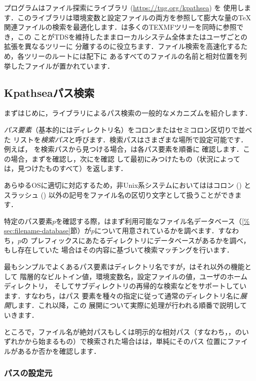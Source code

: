 \documentclass[uplatex,dvipdfmx,tombow]{jsarticle}
\begin{document}
\Webc プログラムはファイル探索に\KPS ライブラリ (\url{https://tug.org/kpathsea}) を
使用します．このライブラリは環境変数と設定ファイルの両方を参照して膨大な量の\TeX
関連ファイルの検索を最適化します．\Webc は多くのTEXMFツリーを同時に参照でき，この
ことがTDSを維持したままローカルシステム全体またはユーザごとの拡張を異なるツリーに
分離するのに役立ちます．ファイル検索を高速化するため，各ツリーのルートには配下に
あるすべてのファイルの名前と相対位置を列挙したファイルが置かれています．

\subsection{Kpathseaパス検索}
\label{sec:kpathsea}

まずはじめに，\KPS ライブラリによるパス検索の一般的なメカニズムを紹介します．

\emph{パス要素}（基本的にはディレクトリ名）をコロンまたはセミコロン区切りで並べた
リストを\emph{検索パス}と呼びます．検索パスはさまざまな場所で設定可能です．例えば，
を検索パスから見つける場合，\KPS は各パス要素を順番に
確認します．この場合，まずを確認し，次にを確認
して最初にみつけたもの（状況によっては，見つけたものすべて）を返します．

あらゆるOSに適切に対応するため，非Unix系システムにおいては\KPS はコロン (\samp{:}) と
スラッシュ (\samp{/}) 以外の記号をファイル名の区切り文字として扱うことができます．

特定のパス要素$p$を確認する際，\KPS はまず利用可能なファイル名データベース（\ref{%
sec:filename-database}節）が$p$について用意されているかを調べます．すなわち，$p$の
プレフィックスにあたるディレクトリにデータベースがあるかを調べ，もし存在していた
場合はその内容に基づいて検索マッチングを行います．

最もシンプルでよくあるパス要素はディレクトリ名ですが，\KPS はそれ以外の機能として
階層的なビルトイン値，環境変数名，設定ファイルの値，ユーザのホームディレクトリ，
そしてサブディレクトリの再帰的な検索などをサポートしています．すなわち，\KPS はパス
要素を種々の指定に従って通常のディレクトリ名に\emph{展開}します．これ以降，この
展開について実際に処理が行われる順番で説明していきます．

ところで，ファイル名が絶対パスもしくは明示的な相対パス（すなわち\samp{/}，，のいずれかから始まるもの）で検索された場合は\KPS は，単純にそのパス
位置にファイルがあるか否かを確認します．

\subsubsection{パスの設定元}
\label{sec:path-sources}
\end{document}
